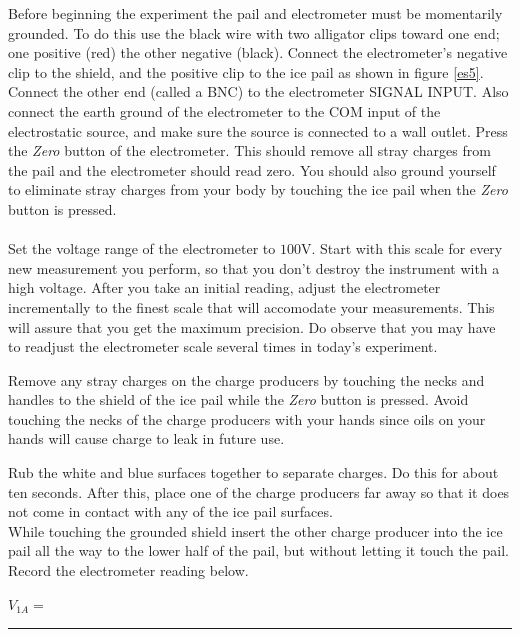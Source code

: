 {{{\noindent Before beginning the experiment the pail and
electrometer must be momentarily grounded.  To do this use the
black wire with two alligator clips toward one end; one positive
(red) the other negative (black).  Connect the electrometer's
negative clip to the shield, and the positive clip to the ice pail
as shown in figure \ref{es5}.  Connect the other end (called a
BNC) to the electrometer SIGNAL INPUT.  Also connect the earth
ground of the electrometer to the COM input of the electrostatic
source, and make sure the source is connected to a wall outlet.
Press the {\it Zero} button of the electrometer. This should
remove all stray charges from the pail and the electrometer
should read zero. You should also ground yourself to eliminate
stray charges from your body by touching the
ice pail when the {\it Zero} button is pressed.\\

\\
\noindent Set the voltage range of the electrometer to $100$V. Start with
this scale for every new measurement you perform, so that you don't destroy
the instrument with a high voltage. After you take an initial reading, adjust
the electrometer incrementally to the finest scale that will accomodate your
measurements. This will assure that you get the maximum precision. Do observe
that you may have to readjust the electrometer scale several times in today's
experiment.

\noindent Remove any stray charges on the charge producers by touching the
necks and handles to the shield of the ice pail while the {\it Zero} button is
pressed.  Avoid touching the necks of the charge producers with your hands
since oils on your hands will cause charge to leak in future use. 

\noindent Rub the white and blue
surfaces together to separate charges. Do this for about ten seconds.  After
this, place one of the charge producers far away so that it does not come in
contact with any of the ice pail surfaces.\\
\noindent While touching the grounded shield insert the other
charge producer into the ice pail all the way to the lower half of
the pail, but without letting it touch the pail.  Record the
electrometer reading below.\\ 

\vspace{1cm}

\hspace{4cm}$V_{1A}=$\rule{5.0cm}{.1mm}\\

}}}

